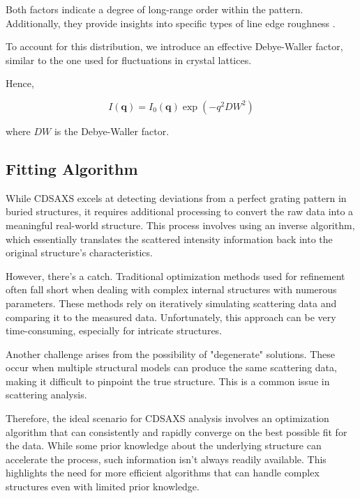 Both factors indicate a degree of long-range order within the pattern. Additionally, they provide insights into specific types of line edge roughness \cite{these_reche}.

To account for this distribution, we introduce an effective Debye-Waller factor, similar to the one used for fluctuations in crystal lattices.

Hence,

\begin{equation}
    I(\mathbf{q}) = I_{0}(\mathbf{q}) \exp(-q^{2}DW^{2} )
\end{equation}

where $DW$ is the Debye-Waller factor.

\subsection{Fitting Algorithm}

While CDSAXS excels at detecting deviations from a perfect grating pattern in buried structures, it requires additional processing to convert the raw data into a meaningful real-world structure. This process involves using an inverse algorithm, which essentially translates the scattered intensity information back into the original structure's characteristics.

\medskip

However, there's a catch. Traditional optimization methods used for refinement often fall short when dealing with complex internal structures with numerous parameters. These methods rely on iteratively simulating scattering data and comparing it to the measured data. Unfortunately, this approach can be very time-consuming, especially for intricate structures.

\medskip

Another challenge arises from the possibility of "degenerate" solutions. These occur when multiple structural models can produce the same scattering data, making it difficult to pinpoint the true structure. This is a common issue in scattering analysis.

\medskip

Therefore, the ideal scenario for CDSAXS analysis involves an optimization algorithm that can consistently and rapidly converge on the best possible fit for the data. While some prior knowledge about the underlying structure can accelerate the process, such information isn't always readily available. This highlights the need for more efficient algorithms that can handle complex structures even with limited prior knowledge.

